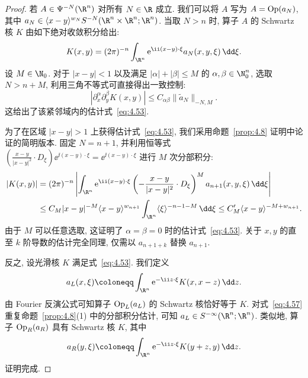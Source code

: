 \begin{proof}
若 $A \in \Psi^{-N}(\R^n)$ 对所有 $N \in \R$ 成立. 我们可以将 $A$ 写为 $A = \operatorname{Op}(a_N)$, 其中 $a_N \in \langle x - y \rangle^{w_N} S^{-N}(\R^n \times \R^n; \R^n)$. 当取 $N > n$ 时, 算子 $A$ 的 Schwartz 核 $K$ 由如下绝对收敛积分给出:
\begin{equation}\label{eq:4.54}
    K(x, y) = (2\pi)^{-n} \int_{\R^n} \ee^{\ii (x-y) \cdot \xi} a_N(x, y, \xi) \,\dd\xi.
\end{equation}
设 $M \in \N_0$. 对于 $|x - y| < 1$ 以及满足 $|\alpha| + |\beta| \le M$ 的 $\alpha, \beta \in \N_0^n$, 选取 $N > n + M$, 利用三角不等式可直接得出一致控制:
\begin{equation}\label{eq:4.55}
    |\partial_x^\alpha \partial_y^\beta K(x, y)| \le C_{\alpha\beta} \|\tilde{a}_N\|_{-N, M}.
\end{equation}
这给出了该紧邻域内的估计式~\eqref{eq:4.53}.

为了在区域 $|x - y| > 1$ 上获得估计式~\eqref{eq:4.53}, 我们采用命题~\ref{prop:4.8} 证明中论证的简明版本. 固定 $N = n + 1$, 并利用恒等式 $(\frac{x-y}{|x-y|^2} \cdot D_\xi) \ee^{\ii(x-y)\cdot\xi} = \ee^{\ii(x-y)\cdot\xi}$ 进行 $M$ 次分部积分:
\begin{equation}\label{eq:4.56}
    \begin{aligned}
        |K(x, y)| &= (2\pi)^{-n} \left| \int_{\R^n} \ee^{\ii(x-y)\cdot\xi} \left( -\frac{x-y}{|x-y|^2} \cdot D_\xi \right)^M a_{n+1}(x, y, \xi) \,\dd\xi \right| \\
        &\le C_M |x - y|^{-M} \langle x - y \rangle^{w_{n+1}} \int_{\R^n} \langle \xi \rangle^{-n-1-M} \,\dd\xi \le C'_M \langle x - y \rangle^{-M + w_{n+1}}.
    \end{aligned}
\end{equation}
由于 $M$ 可以任意选取, 这证明了 $\alpha = \beta = 0$ 时的估计式~\eqref{eq:4.53}. 关于 $x, y$ 的直至 $k$ 阶导数的估计完全同理, 仅需以 $a_{n+1+k}$ 替换 $a_{n+1}$.

反之, 设光滑核 $K$ 满足式~\eqref{eq:4.53}. 我们定义
\begin{equation}\label{eq:4.57}
    a_L(x, \xi) \defeq \int_{\R^n} \ee^{-\ii z \cdot \xi} K(x, x - z) \,\dd z.
\end{equation}
由 Fourier 反演公式可知算子 $\operatorname{Op}_L(a_L)$ 的 Schwartz 核恰好等于 $K$. 对式~\eqref{eq:4.57} 重复命题~\ref{prop:4.8}(1) 中的分部积分估计, 可知 $a_L \in S^{-\infty}(\R^n; \R^n)$. 类似地, 算子 $\operatorname{Op}_R(a_R)$ 具有 Schwartz 核 $K$, 其中
\begin{equation}\label{eq:4.58}
    a_R(y, \xi) \defeq \int_{\R^n} \ee^{-\ii z \cdot \xi} K(y + z, y) \,\dd z.
\end{equation}
证明完成.
\end{proof}

